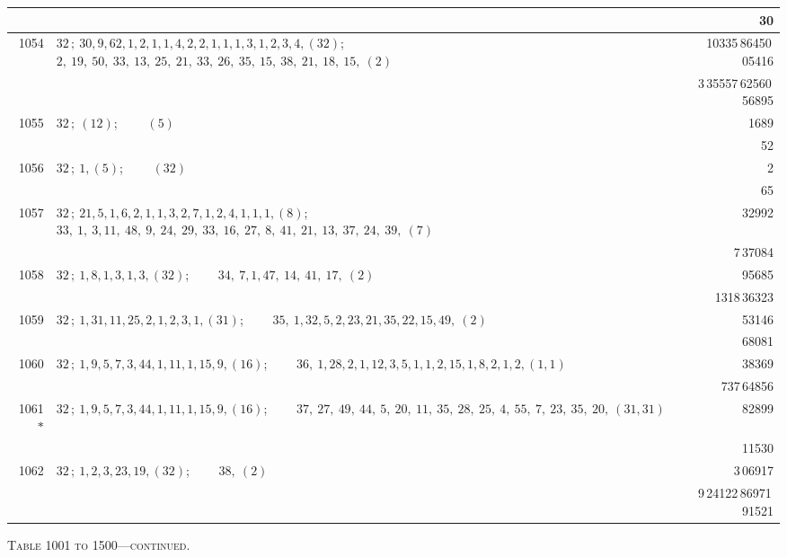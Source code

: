 \documentclass[11pt]{article}
\providecommand{\asterism}{*}
\begin{document}
\begin{longtable}{|r|p{}|r|}
 & & 30 \\
\hline
1054 & $32\,;\ 30, 9, 62, 1, 2, 1, 1, 4, 2, 2, 1, 1, 1, 3, 1, 2, 3, 4, (32)$; \ \ \ \ $2,\ 19,\ 50,\ 33,\ 13,\ 25,\ 21,\ 33,\ 26,\ 35,\ 15,\ 38,\ 21,\ 18,\ 15,\ (2)$ & 10335\,86450\,05416 \\
 & & 3\,35557\,62560\,56895 \\
\hline
1055 & $32\,;\ (12)$; \ \ \ \ $(5)$ & 1689 \\
 & & 52 \\
\hline
1056 & $32\,;\ 1, (5)$; \ \ \ \ $(32)$ & 2 \\
 & & 65 \\
\hline
1057 & $32\,;\ 21, 5, 1, 6, 2, 1, 1, 3, 2, 7, 1, 2, 4, 1, 1, 1, (8)$; \ \ \ \ $33,\ 1,\ 3, 11,\ 48,\ 9,\ 24,\ 29,\ 33,\ 16,\ 27,\ 8,\ 41,\ 21,\ 13,\ 37,\ 24,\ 39,\ (7)$ & 32992 \\
 & & 7\,37084 \\
\hline
1058 & $32\,;\ 1, 8, 1, 3, 1, 3, (32)$; \ \ \ \ $34,\ 7, 1, 47,\ 14,\ 41,\ 17,\ (2)$ & 95685 \\
 & & 1318\,36323 \\
\hline
1059 & $32\,;\ 1, 31, 11, 25, 2, 1, 2, 3, 1, (31)$; \ \ \ \ $35,\ 1, 32, 5, 2, 23, 21, 35, 22, 15, 49,\ (2)$ & 53146 \\
 & & 68081 \\
\hline
1060 & $32\,;\ 1, 9, 5, 7, 3, 44, 1, 11, 1, 15, 9, (16)$; \ \ \ \ $36,\ 1, 28, 2, 1, 12, 3, 5, 1, 1, 2, 15, 1, 8, 2, 1, 2, (1, 1)$ & 38369 \\
 & & 737\,64856 \\
\hline
1061$\asterism$ & $32\,;\ 1, 9, 5, 7, 3, 44, 1, 11, 1, 15, 9, (16)$; \ \ \ \ $37,\ 27,\ 49,\ 44,\ 5,\ 20,\ 11,\ 35,\ 28,\ 25,\ 4,\ 55,\ 7,\ 23,\ 35,\ 20,\ (31, 31)$ & 82899 \\
 & & 11530 \\
\hline
1062 & $32\,;\ 1, 2, 3, 23, 19, (32)$; \ \ \ \ $38,\ (2)$ & 3\,06917 \\
 & & 9\,24122\,86971\,91521 \\
\hline
\end{longtable}

\begin{center}
\small\textsc{Table 1001 to 1500---continued.}
\end{center}
\end{document}
